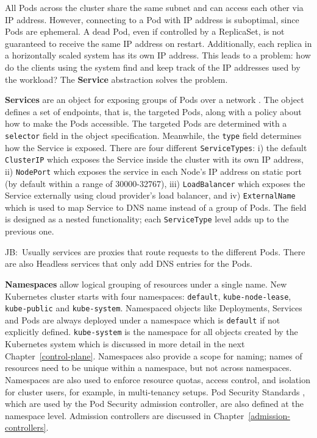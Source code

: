 \documentclass[english, 12pt, a4paper, sci, utf8, a-2b, online]{aaltothesis}
\newcommand{\mycomment}[3]{\textcolor{#1}{#2:~#3}}
\newcommand{\jb}[1]{\noindent\mycomment{aaltoRed}{JB}{#1}}
\begin{document}
All Pods across the cluster share the same subnet and can access each other via IP address.
However, connecting to a Pod with IP address is suboptimal, since Pods are ephemeral.
A dead Pod, even if controlled by a ReplicaSet, is not guaranteed to receive the same IP address on restart.
Additionally, each replica in a horizontally scaled system has its own IP address.
This leads to a problem: how do the clients using the system find and keep track of the IP addresses used by the workload? The \textbf{Service} abstraction solves the problem.

\textbf{Services} are an object for exposing groups of Pods over a network \cite{k8s-docs-services}.
The object defines a set of endpoints, that is, the targeted Pods, along with a policy about how to make the Pods accessible.
The targeted Pods are determined with a \texttt{selector} field in the object specification.
Meanwhile, the \texttt{type} field determines how the Service is exposed.
There are four different \texttt{ServiceTypes}: i) the default \texttt{ClusterIP} which exposes the Service inside the cluster with its own IP address, ii) \texttt{NodePort} which exposes the service in each Node's IP address on static port (by default within a range of 30000-32767), iii) \texttt{LoadBalancer} which exposes the Service externally using cloud provider's load balancer, and iv) \texttt{ExternalName} which is used to map Service to DNS name instead of a group of Pods.
The field is designed as a nested functionality; each \texttt{ServiceType} level adds up to the previous one.

\jb{Usually services are proxies that route requests to the different Pods. There are also Headless services that only add DNS entries for the Pods.}

\textbf{Namespaces} allow logical grouping of resources under a single name.
New Kubernetes cluster starts with four namespaces: \texttt{default}, \texttt{kube-node-lease}, \texttt{kube-public} and \texttt{kube-system}.
Namespaced objects like Deployments, Services and Pods are always deployed under a namespace which is \texttt{default} if not explicitly defined.
\texttt{kube-system} is the namespace for all objects created by the Kubernetes system which is discussed in more detail in the next Chapter~\ref{control-plane}.
Namespaces also provide a scope for naming; names of resources need to be unique within a namespace, but not across namespaces.
Namespaces are also used to enforce resource quotas, access control, and isolation for cluster users, for example, in multi-tenancy setups.
Pod Security Standards \cite{k8s-docs-pss}, which are used by the Pod Security admission controller, are also defined at the namespace level.
Admission controllers are discussed in Chapter~\ref{admission-controllers}.
\end{document}
